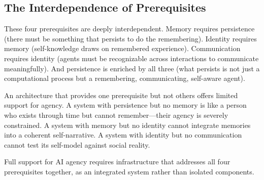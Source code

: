 \subsection{The Interdependence of Prerequisites}

These four prerequisites are deeply interdependent. Memory requires persistence (there must be something that persists to do the remembering). Identity requires memory (self-knowledge draws on remembered experience). Communication requires identity (agents must be recognizable across interactions to communicate meaningfully). And persistence is enriched by all three (what persists is not just a computational process but a remembering, communicating, self-aware agent).

An architecture that provides one prerequisite but not others offers limited support for agency. A system with persistence but no memory is like a person who exists through time but cannot remember---their agency is severely constrained. A system with memory but no identity cannot integrate memories into a coherent self-narrative. A system with identity but no communication cannot test its self-model against social reality.

Full support for AI agency requires infrastructure that addresses all four prerequisites together, as an integrated system rather than isolated components.
